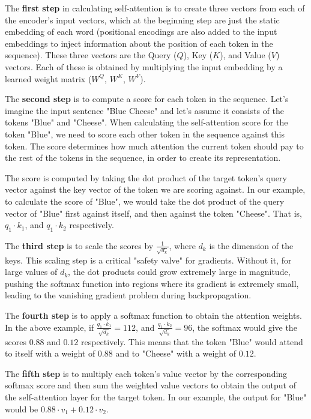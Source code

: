 \documentclass[a4paper,12pt]{article}
\begin{document}
The \textbf{first step} in calculating self-attention is to create three vectors from each of the encoder's input vectors, which at the beginning step are just the static embedding of each word (positional encodings are also added to the input embeddings to inject information about the position of each token in the sequence). These three vectors are the Query ($Q$), Key ($K$), and Value ($V$) vectors. Each of these is obtained by multiplying the input embedding by a learned weight matrix ($W^Q$, $W^K$, $W^V$). 

The \textbf{second step} is to compute a score for each token in the sequence. Let's imagine the input sentence "Blue Cheese" and let's assume it consists of the tokens "Blue" and "Cheese". When calculating the self-attention score for the token "Blue", we need to score each other token in the sequence against this token. The score determines how much attention the current token should pay to the rest of the tokens in the sequence, in order to create its representation. 

The score is computed by taking the dot product of the target token's query vector against the key vector of the token we are scoring against. In our example, to calculate the score of "Blue", we would take the dot product of the query vector of "Blue" first against itself, and then against the token "Cheese". That is, $q_1 \cdot k_1$, and $q_1 \cdot k_2$ respectively. 

The \textbf{third step} is to scale the scores by $\frac{1}{\sqrt{d_k}}$, where $d_k$ is the dimension of the keys. This scaling step is a critical "safety valve" for gradients. Without it, for large values of $d_k$, the dot products could grow extremely large in magnitude, pushing the softmax function into regions where its gradient is extremely small, leading to the vanishing gradient problem during backpropagation.

The \textbf{fourth step} is to  apply a softmax function to obtain the attention weights. In the above example, if $\frac{q_1 \cdot k_1}{\sqrt{d_k}}=112$, and $\frac{q_1 \cdot k_2}{\sqrt{d_k}}=96$, the softmax would give the scores $0.88$ and $0.12$ respectively. This means that the token "Blue" would attend to itself with a weight of $0.88$ and to "Cheese" with a weight of $0.12$. 

The \textbf{fifth step} is to multiply each token's value vector by the corresponding softmax score and then sum the weighted value vectors to obtain the output of the self-attention layer for the target token. In our example, the output for "Blue" would be $0.88 \cdot v_1 + 0.12 \cdot v_2$.
\end{document}

